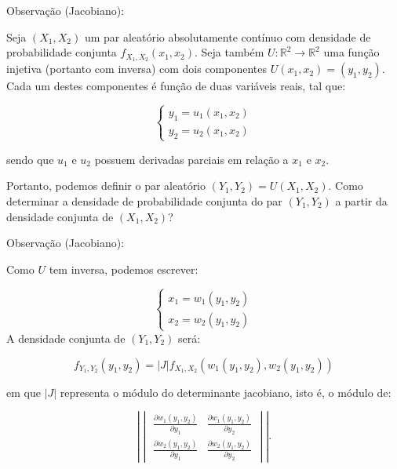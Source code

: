 \documentclass[12pt]{beamer}
\begin{document}
\begin{frame}{Observação (Jacobiano):}
	\begin{block}{}
		\justifying
Seja $(X_{1},X_{2})$ um par aleatório absolutamente contínuo com densidade de probabilidade conjunta $f_{X_{1},X_{2}}(x_{1},x_{2})$. Seja também $U: \mathbb{R}^2 \rightarrow \mathbb{R}^2$ uma função injetiva (portanto com inversa) com dois componentes $U(x_{1},x_{2}) = (y_{1},y_{2})$. Cada um destes componentes é função de duas variáveis reais, tal que:

\[
\begin{cases}
	y_{1} = u_1(x_{1},x_{2}) \\
	y_{2} = u_2(x_{1},x_{2})
\end{cases}
\]

sendo que $u_1$ e $u_2$ possuem derivadas parciais em relação a $x_{1}$ e $x_{2}$.

Portanto, podemos definir o par aleatório $(Y_{1},Y_{2}) = U(X_{1},X_{2})$. Como determinar a densidade de probabilidade conjunta do par $(Y_{1},Y_{2})$ a partir da densidade conjunta de $(X_{1},X_{2})$?
	\end{block}
\end{frame}

\begin{frame}{Observação (Jacobiano):}
	\begin{block}{}
		\justifying
		Como $U$ tem inversa, podemos escrever:
		
		\[
		\begin{cases}
			x_{1} = w_1(y_{1},y_{2}) \\
			x_{2} = w_2(y_{1},y_{2})
		\end{cases}
		\]
A densidade conjunta de $(Y_{1},Y_{2})$ será:

\[
f_{Y_{1},Y_{2}}(y_{1},y_{2}) = \left| J \right| f_{X_{1},X_{2}}\left(w_1(y_{1},y_{2}), w_2(y_{1},y_{2})\right)
\]

em que $\left| J \right|$ representa o módulo do determinante jacobiano, isto é, o módulo de:

\[
\left| 
\begin{vmatrix}
	\frac{\partial w_1(y_{1},y_{2})}{\partial y_{1}} & \frac{\partial w_1(y_{1},y_{2})}{\partial y_{2}} \\
	\frac{\partial w_2(y_{1},y_{2})}{\partial y_{1}} & \frac{\partial w_2(y_{1},y_{2})}{\partial y_{2}}
\end{vmatrix}
\right|.
\]		
	\end{block}
\end{frame}
\end{document}
